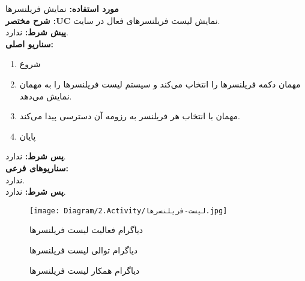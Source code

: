 
\textbf{مورد استفاده:}
نمایش فریلنسرها
\\
\textbf{شرح مختصر :UC}
نمایش لیست فریلنسرهای فعال در سایت.
\\
\textbf{پيش شرط:}
ندارد.
\\
\textbf{سناريو اصلی:}
\begin{enumerate}
\item
شروع
\item
مهمان دکمه فریلنسرها را انتخاب می‌کند و سیستم لیست فریلنسرها را به مهمان نمایش می‌دهد.
\item
مهمان با انتخاب هر فریلنسر به رزومه آن دسترسی پیدا می‌کند.
\item
پایان
\end{enumerate}

\noindent
\textbf{پس شرط:}
ندارد.
\\
\textbf{سناريوهای فرعی:}
\\
ندارد.
\\
\textbf{پس شرط:}
ندارد.


\begin{figure}[H]
	\centering
	\texttt{[image: Diagram/2.Activity/لیست-فریلنسرها.jpg]}
	\caption{دیاگرام فعالیت لیست فریلنسر‌ها}
	\label{fig:a:لیست-فریلنسر‌ها}
\end{figure}
\begin{figure}[H]
	\centering
	\caption{دیاگرام توالی لیست فریلنسر‌ها}
	\label{fig:s:لیست-فریلنسر‌ها}
\end{figure}
\begin{figure}[H]
	\centering
	\caption{دیاگرام همکار لیست فریلنسر‌ها}
	\label{fig:c:لیست-فریلنسر‌ها}
\end{figure}